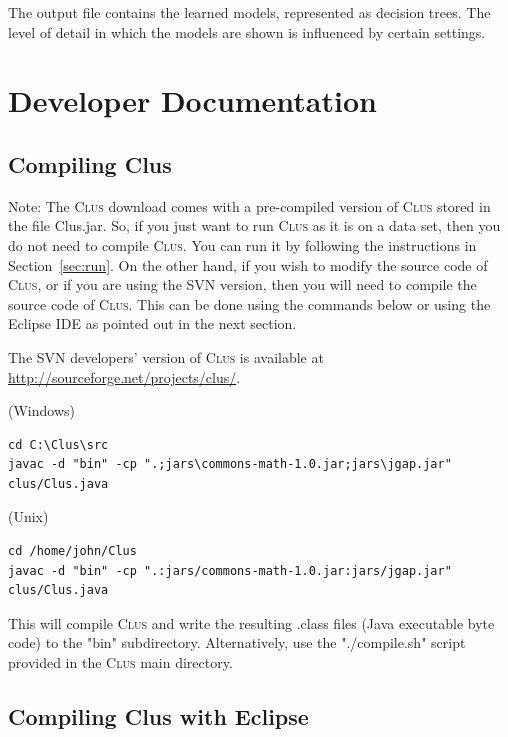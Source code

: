 \documentclass[a4paper]{report}
\newcommand{\clus}{\textsc{Clus}}
\begin{document}
The output file contains the learned models, represented as decision trees.  The level of detail in which the models are shown is influenced by certain settings.

\chapter{Developer Documentation}
\label{ch:devel}

\section{Compiling Clus}

Note: The \clus{} download comes with a pre-compiled version of \clus{} stored in the file Clus.jar. So, if you just want to run \clus{} as it is on a data set, then you do not need to compile \clus{}. You can run it by following the instructions in Section~\ref{sec:run}. On the other hand, if you wish to modify the source code of \clus{}, or if you are using the SVN version, then you will need to compile the source code of \clus{}. This can be done using the commands
below or using the Eclipse IDE as pointed out in the next section.

The SVN developers' version of \clus{} is available at \url{http://sourceforge.net/projects/clus/}.

\vspace*{1em}\noindent(Windows)

\begin{small}
\begin{verbatim}
cd C:\Clus\src
javac -d "bin" -cp ".;jars\commons-math-1.0.jar;jars\jgap.jar" clus/Clus.java
\end{verbatim}
\end{small}

\noindent(Unix)

\begin{small}
\begin{verbatim}
cd /home/john/Clus
javac -d "bin" -cp ".:jars/commons-math-1.0.jar:jars/jgap.jar" clus/Clus.java
\end{verbatim}
\end{small}
This will compile \clus{} and write the resulting .class files (Java executable 
byte code) to the "bin" subdirectory.
%
Alternatively, use the "./compile.sh" script provided in the \clus{} main directory.

\section{Compiling Clus with Eclipse}
\end{document}
